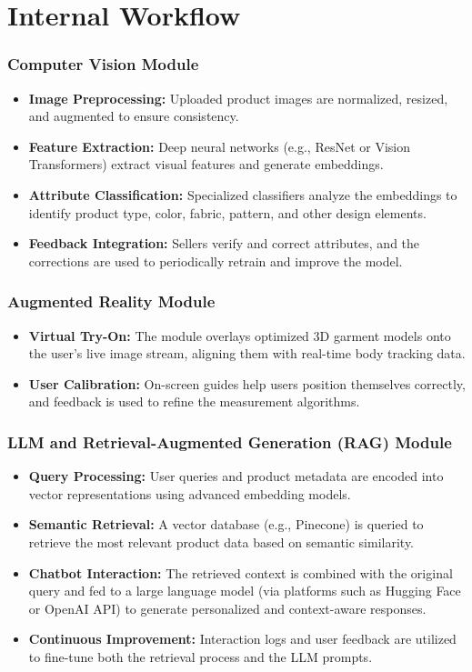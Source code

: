 \section{Internal Workflow}
\subsubsection{Computer Vision Module}
\begin{itemize}
    \item \textbf{Image Preprocessing:} Uploaded product images are normalized, resized, and augmented to ensure consistency.
    \item \textbf{Feature Extraction:} Deep neural networks (e.g., ResNet or Vision Transformers) extract visual features and generate embeddings.
    \item \textbf{Attribute Classification:} Specialized classifiers analyze the embeddings to identify product type, color, fabric, pattern, and other design elements.
    \item \textbf{Feedback Integration:} Sellers verify and correct attributes, and the corrections are used to periodically retrain and improve the model.
\end{itemize}

\subsubsection{Augmented Reality Module}
\begin{itemize}
    \item \textbf{Virtual Try-On:} The module overlays optimized 3D garment models onto the user’s live image stream, aligning them with real-time body tracking data.
    \item \textbf{User Calibration:} On-screen guides help users position themselves correctly, and feedback is used to refine the measurement algorithms.
\end{itemize}

\subsubsection{LLM and Retrieval-Augmented Generation (RAG) Module}
\begin{itemize}
    \item \textbf{Query Processing:} User queries and product metadata are encoded into vector representations using advanced embedding models.
    \item \textbf{Semantic Retrieval:} A vector database (e.g., Pinecone) is queried to retrieve the most relevant product data based on semantic similarity.
    \item \textbf{Chatbot Interaction:} The retrieved context is combined with the original query and fed to a large language model (via platforms such as Hugging Face or OpenAI API) to generate personalized and context-aware responses.
    \item \textbf{Continuous Improvement:} Interaction logs and user feedback are utilized to fine-tune both the retrieval process and the LLM prompts.
\end{itemize}


